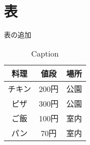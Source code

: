 \documentclass[platex,dvipdfmx]{beamer}			%
\begin{document}
\section{表}
\begin{frame}{表の追加}
    \begin{table}
        \caption{Caption}
        \label{table:sample}
        \centering
            \begin{tabular}{ccc}
            \hline
            料理    & 値段   &  場所  \\
            \hline \hline
            チキン  & 200円  & 公園 \\
            ピザ    & 300円  & 公園 \\
            ご飯    & 100円  & 室内 \\
            パン    &  70円  &  室内 \\
            \hline
            \end{tabular}
    \end{table}
\end{frame}
\end{document}
